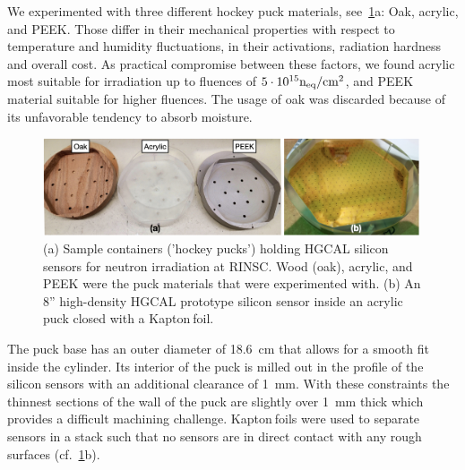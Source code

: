 We experimented with three different hockey puck materials, see~\ref{fig:Pucks_Arrayed}a: Oak, acrylic, and PEEK. 
Those differ in their mechanical properties with respect to temperature and humidity fluctuations, in their activations, radiation hardness and overall cost.
As practical compromise between these factors, we found acrylic most suitable for irradiation up to fluences of $5\cdot 10^{15}\mathrm{n_{eq}}/\mathrm{cm}^{2}$, and PEEK material suitable for higher fluences. 
The usage of oak was discarded because of its unfavorable tendency to absorb moisture.
\begin{figure}[!hbt]
  \begin{center}
    \includegraphics[width=0.99\textwidth]{figures/figures_edited_002.jpeg}
    \caption{(a) Sample containers ('hockey pucks') holding HGCAL silicon sensors for neutron irradiation at RINSC. 
    Wood (oak), acrylic, and PEEK were the puck materials that were experimented with.
    (b) An 8'' high-density HGCAL prototype silicon sensor inside an acrylic puck closed with a Kapton\texttrademark$~$foil.}
    \label{fig:Pucks_Arrayed}
  \end{center}
\end{figure}
The puck base has an outer diameter of \SI{18.6}{\centi\metre} that allows for a smooth fit inside the cylinder. 
Its interior of the puck is milled out in the profile of the silicon sensors with an additional clearance of \SI{1}{\milli\metre}. 
With these constraints the thinnest sections of the wall of the puck are slightly over \SI{1}{\milli\metre} thick which provides a difficult machining challenge.
Kapton\texttrademark$~$foils were used to separate sensors in a stack such that no sensors are in direct contact with any rough surfaces (cf.~\ref{fig:Pucks_Arrayed}b).

